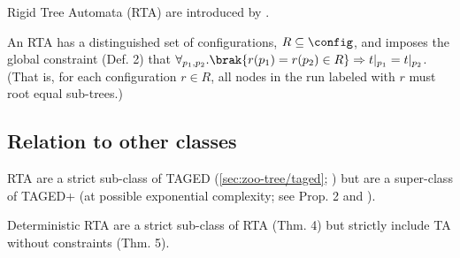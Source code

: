 Rigid Tree Automata (RTA) are introduced by \cite{jacquemard:rta}.

An RTA has a distinguished set of configurations, $R \subseteq \config$, and
imposes the global constraint (Def. 2) that $\forall_{p_1,p_2} . \brak{
r(p_1) = r(p_2) \in R } \Rightarrow t\vert_{p_1} = t\vert_{p_2}$.  (That is,
for each configuration $r \in R$, all nodes in the run labeled with $r$ must
root equal sub-trees.)


\subsection{Relation to other classes}
RTA are a strict sub-class of TAGED (\autoref{sec:zoo-tree/taged};
\cite[Sec. 3.1]{jacquemard:rta}) but are a super-class of TAGED+ (at
possible exponential complexity; see Prop. 2 and \cite{filiot:tagc}).


Deterministic RTA are a strict sub-class of RTA (Thm. 4) but strictly
include TA without constraints (Thm. 5).

